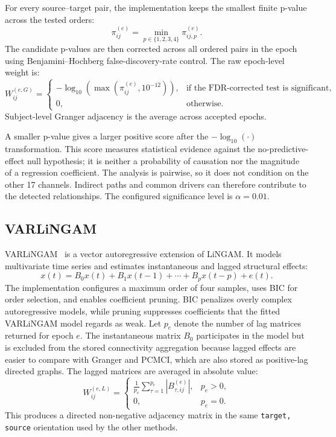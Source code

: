 \documentclass[11pt,a4paper]{article}
\begin{document}
For every source--target pair, the implementation keeps the smallest finite
p-value across the tested orders:
\[
    \pi_{ij}^{(e)}=\min_{p\in\{1,2,3,4\}}\pi_{ij,p}^{(e)}.
\]
The candidate p-values are then corrected across all ordered pairs in the
epoch using Benjamini--Hochberg false-discovery-rate control. The raw
epoch-level weight is:
\[
    W_{ij}^{(e,G)}=
    \begin{cases}
    -\log_{10}\left(\max(\pi_{ij}^{(e)},10^{-12})\right),
    & \text{if the FDR-corrected test is significant},\\
    0, & \text{otherwise}.
    \end{cases}
\]
Subject-level Granger adjacency is the average across accepted epochs.

A smaller p-value gives a larger positive score after the
$-\log_{10}(\cdot)$ transformation. This score measures statistical evidence
against the no-predictive-effect null hypothesis; it is neither a probability
of causation nor the magnitude of a regression coefficient. The analysis is
pairwise, so it does not condition on the other 17 channels. Indirect paths
and common drivers can therefore contribute to the detected relationships.
The configured significance level is $\alpha=0.01$.

\subsection{VARLiNGAM}

VARLiNGAM~\cite{varlingamdocs} is a vector autoregressive extension of
LiNGAM. It models multivariate time series and estimates instantaneous and
lagged structural effects:
\[
    x(t)=B_0x(t)+B_1x(t-1)+\cdots+B_px(t-p)+e(t).
\]
The implementation configures a maximum order of four samples, uses BIC
for order selection, and enables coefficient pruning. BIC penalizes overly
complex autoregressive models, while pruning suppresses coefficients that the
fitted VARLiNGAM model regards as weak. Let $p_e$ denote the number of lag
matrices returned for epoch $e$. The instantaneous matrix $B_0$ participates
in the model but is excluded from the stored connectivity aggregation because
lagged effects are easier to compare with Granger and PCMCI, which are also
stored as positive-lag directed graphs. The lagged matrices are averaged in
absolute value:
\[
    W_{ij}^{(e,L)} =
    \begin{cases}
    \displaystyle\frac{1}{p_e}\sum_{\tau=1}^{p_e}
    \left|B_{\tau,ij}^{(e)}\right|, & p_e>0,\\
    0, & p_e=0.
    \end{cases}
\]
This produces a directed non-negative adjacency matrix in the same
\texttt{target, source} orientation used by the other methods.
\end{document}
